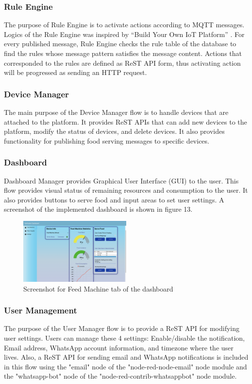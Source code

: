 ﻿\documentclass[conference]{IEEEtran}
\begin{document}
\subsubsection{Rule Engine}
The purpose of Rule Engine is to activate actions according to MQTT messages.
Logics of the Rule Engine was inspired by “Build Your Own IoT Platform” \cite{b14}.
For every published message, Rule Engine checks the rule table of the database to find the rules whose message pattern satisfies the message content.
Actions that corresponded to the rules are defined as ReST API form, thus activating action will be progressed as sending an HTTP request.

\subsubsection{Device Manager}
The main purpose of the Device Manager flow is to handle devices that are attached to the platform.
It provides ReST APIs that can add new devices to the platform, modify the status of devices, and delete devices.
It also provides functionality for publishing food serving messages to specific devices.

\subsubsection{Dashboard}
Dashboard Manager provides Graphical User Interface (GUI) to the user.
This flow provides visual status of remaining resources and consumption to the user.
It also provides buttons to serve food and input areas to set user settings. A screenshot of the implemented dashboard is shown in figure 13.

\begin{figure}[htbp]
\centerline{\includegraphics[width=0.5\textwidth]{./images/feed_machine_ui.png}}
\caption{Screenshot for Feed Machine tab of the dashboard}
\label{fig}
\end{figure}

\subsubsection{User Management}
The purpose of the User Manager flow is to provide a ReST API for modifying user settings.
Users can manage these 4 settings: Enable/disable the notification, Email address, WhatsApp account information, and timezone where the user lives.
Also, a ReST API for sending email and WhatsApp notifications is included in this flow using the "email" node of the "node-red-node-email" node module and the "whatsapp-bot" node of the "node-red-contrib-whatsappbot" node module.
\end{document}
